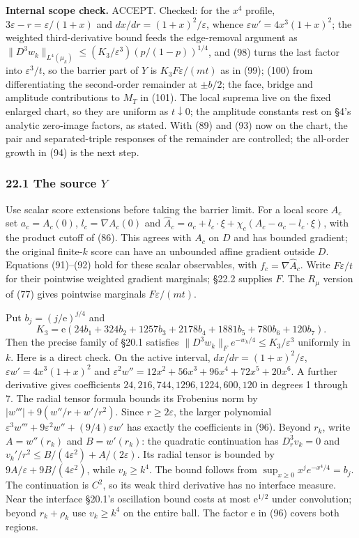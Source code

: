 \documentclass[11pt,a4paper]{article}
\begin{document}
\textbf{Internal scope check.} ACCEPT. Checked: for the \(x^4\) profile,
\(3\varepsilon-r=\varepsilon/(1+x)\) and \(dx/dr=(1+x)^2/\varepsilon\),
whence \(\varepsilon w'=4x^3(1+x)^2\); the weighted third-derivative
bound feeds the edge-removal argument as
\(\|D^3w_k\|_{L^4(\mu_k)}\le(K_3/\varepsilon^3)(p/(1-p))^{1/4}\), and
(98) turns the last factor into \(\varepsilon^3/t\), so the barrier part
of \(Y\) is \(K_3F\varepsilon/(mt)\) as in (99); (100) from
differentiating the second-order remainder at \(\pm b/2\); the face,
bridge and amplitude contributions to \(M_T\) in (101). The local
suprema live on the fixed enlarged chart, so they are uniform as
\(t\downarrow0\); the amplitude constants rest on §4's analytic
zero-image factors, as stated. With (89) and (93) now on the chart, the
pair and separated-triple responses of the remainder are controlled; the
all-order growth in (94) is the next step.

\hypertarget{the-source-y}{%
\subsubsection{\texorpdfstring{22.1 The source
\(Y\)}{22.1 The source Y}}\label{the-source-y}}

Use scalar score extensions before taking the barrier limit. For a local
score \(A_c\) set \(a_c=A_c(0)\), \(l_c=\nabla A_c(0)\) and
\(\widehat A_c=a_c+l_c\cdot\xi+\chi_c(A_c-a_c-l_c\cdot\xi)\), with the
product cutoff of (86). This agrees with \(A_c\) on \(D\) and has
bounded gradient; the original finite-\(k\) score can have an unbounded
affine gradient outside \(D\). Equations (91)--(92) hold for these
scalar observables, with \(f_c=\nabla\widehat A_c\). Write
\(F\varepsilon/t\) for their pointwise weighted gradient marginals;
§22.2 supplies \(F\). The \(R_\mu\) version of (77) gives pointwise
marginals \(F\varepsilon/(mt)\).

Put \(b_j=(j/\mathrm e)^{j/4}\) and
\[K_3=\mathrm e(24b_1+324b_2+1257b_3+2178b_4
                    +1881b_5+780b_6+120b_7).\tag{96}\] Then the precise
family of §20.1 satisfies
\(\|D^3w_k\|_F e^{-w_k/4}\le K_3/\varepsilon^3\) uniformly in \(k\).
Here is a direct check. On the active interval,
\(dx/dr=(1+x)^2/\varepsilon\), \(\varepsilon w'=4x^3(1+x)^2\) and
\(\varepsilon^2w''=12x^2+56x^3+96x^4+72x^5+20x^6\). A further derivative
gives coefficients \(24,216,744,1296,1224,600,120\) in degrees 1 through
7. The radial tensor formula bounds its Frobenius norm by
\(|w'''|+9(w''/r+w'/r^2)\). Since \(r\ge2\varepsilon\), the larger
polynomial \(\varepsilon^3w'''+9\varepsilon^2w''+(9/4)\varepsilon w'\)
has exactly the coefficients in (96). Beyond \(r_k\), write
\(A=w''(r_k)\) and \(B=w'(r_k)\): the quadratic continuation has
\(D_r^3v_k=0\) and \(v_k'/r^2\le B/(4\varepsilon^2)+A/(2\varepsilon)\).
Its radial tensor is bounded by \(9A/\varepsilon+9B/(4\varepsilon^2)\),
while \(v_k\ge k^4\). The bound follows from
\(\sup_{x\ge0}x^je^{-x^4/4}=b_j\). The continuation is \(C^2\), so its
weak third derivative has no interface measure. Near the interface
§20.1's oscillation bound costs at most \(\mathrm e^{1/2}\) under
convolution; beyond \(r_k+\rho_k\) use \(v_k\ge k^4\) on the entire
ball. The factor \(\mathrm e\) in (96) covers both regions.
\end{document}
